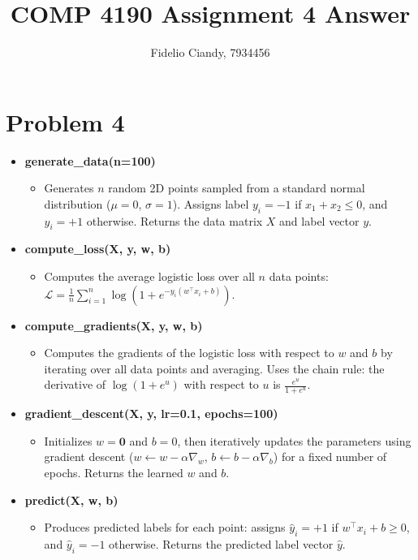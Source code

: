 \documentclass[12pt,fleqn]{article}
\title{COMP 4190 Assignment 4 Answer}
\author{Fidelio Ciandy, 7934456}
\date{}
\begin{document}
\maketitle
\newpage

\section*{Problem 4}

\begin{itemize}
  \item \textbf{generate\_data(n=100)}
  \begin{itemize}
    \item Generates $n$ random 2D points sampled from a standard normal distribution ($\mu=0$, $\sigma=1$). Assigns label $y_i = -1$ if $x_1 + x_2 \leq 0$, and $y_i = +1$ otherwise. Returns the data matrix $X$ and label vector $y$.

  \end{itemize}

  \item \textbf{compute\_loss(X, y, w, b)}
  \begin{itemize}
    \item Computes the average logistic loss over all $n$ data points:
    $\mathcal{L} = \frac{1}{n}\sum_{i=1}^{n} \log(1 + e^{-y_i(w^\top x_i + b)})$.
  \end{itemize}

  \item \textbf{compute\_gradients(X, y, w, b)}
  \begin{itemize}
    \item Computes the gradients of the logistic loss with respect to $w$ and $b$ by iterating over all data points and averaging. Uses the chain rule: the derivative of $\log(1+e^u)$ with respect to $u$ is $\frac{e^u}{1+e^u}$.
  \end{itemize}

  \item \textbf{gradient\_descent(X, y, lr=0.1, epochs=100)}
  \begin{itemize}
    \item Initializes $w = \mathbf{0}$ and $b = 0$, then iteratively updates the parameters using gradient descent ($w \leftarrow w - \alpha \nabla_w$, $b \leftarrow b - \alpha \nabla_b$) for a fixed number of epochs. Returns the learned $w$ and $b$.
  \end{itemize}

  \item \textbf{predict(X, w, b)}
  \begin{itemize}
    \item Produces predicted labels for each point: assigns $\hat{y}_i = +1$ if $w^\top x_i + b \geq 0$, and $\hat{y}_i = -1$ otherwise. Returns the predicted label vector $\hat{y}$.
  \end{itemize}


\end{itemize}
\end{document}
